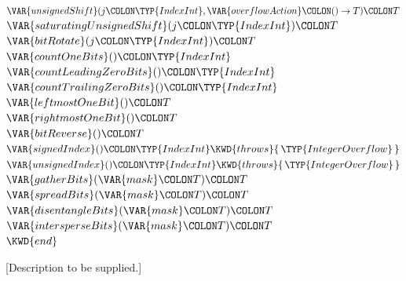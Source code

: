 \begin{Fortress}
\(  \VAR{unsignedShift}(j\COLON \TYP{IndexInt}, \VAR{overflowAction}\COLON ()\rightarrow{}T)\COLON T\)\\
\(  \VAR{saturatingUnsignedShift}(j\COLON \TYP{IndexInt})\COLON T\)\\
\(  \VAR{bitRotate}(j\COLON \TYP{IndexInt})\COLON T\)\\
\(  \VAR{countOneBits}()\COLON \TYP{IndexInt}\)\\
\(  \VAR{countLeadingZeroBits}()\COLON \TYP{IndexInt}\)\\
\(  \VAR{countTrailingZeroBits}()\COLON \TYP{IndexInt}\)\\
\(  \VAR{leftmostOneBit}()\COLON T\)\\
\(  \VAR{rightmostOneBit}()\COLON T\)\\
\(  \VAR{bitReverse}()\COLON T\)\\
\(  \VAR{signedIndex}()\COLON \TYP{IndexInt} \KWD{throws} \{\,\TYP{IntegerOverflow}\,\}\)\\
\(  \VAR{unsignedIndex}()\COLON \TYP{IndexInt} \KWD{throws} \{\,\TYP{IntegerOverflow}\,\}\)\\
\(  \VAR{gatherBits}(\VAR{mask}\COLON T)\COLON T\)\\
\(  \VAR{spreadBits}(\VAR{mask}\COLON T)\COLON T\)\\
\(  \VAR{disentangleBits}(\VAR{mask}\COLON T)\COLON T\)\\
\(  \VAR{intersperseBits}(\VAR{mask}\COLON T)\COLON T\)\-\\\poptabs
\(\KWD{end}\)
\end{Fortress}



[Description to be supplied.]


